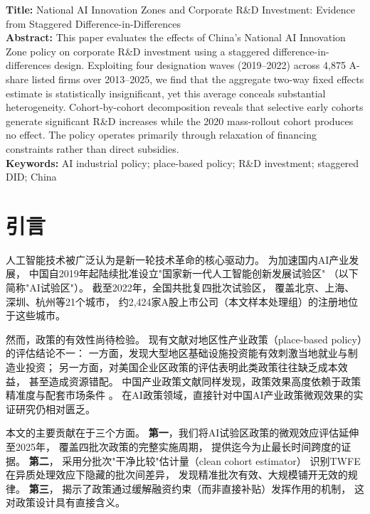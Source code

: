 \documentclass[12pt, a4paper]{article}
\begin{document}
\begin{titlepage}
\begin{center}
\begin{minipage}{0.88\textwidth}
\small{}
\textbf{Title:} National AI Innovation Zones and Corporate R\&D Investment:
Evidence from Staggered Difference-in-Differences\\[0.3em]
\textbf{Abstract:}
This paper evaluates the effects of China's National AI Innovation Zone policy
on corporate R\&D investment using a staggered difference-in-differences design.
Exploiting four designation waves (2019--2022) across 4,875 A-share listed firms
over 2013--2025, we find that the aggregate two-way fixed effects estimate is
statistically insignificant, yet this average conceals substantial heterogeneity.
Cohort-by-cohort decomposition reveals that selective early cohorts generate
significant R\&D increases while the 2020 mass-rollout cohort produces no effect.
The policy operates primarily through relaxation of financing constraints rather
than direct subsidies.\\[0.3em]
\textbf{Keywords:} AI industrial policy; place-based policy; R\&D investment;
staggered DID; China
\end{minipage}

\end{center}
\end{titlepage}

\setcounter{page}{1}

\section{引\quad 言}
\label{sec:intro}

人工智能技术被广泛认为是新一轮技术革命的核心驱动力。
为加速国内AI产业发展，
中国自2019年起陆续批准设立"国家新一代人工智能创新发展试验区"
（以下简称"AI试验区"）。
截至2022年，全国共批复四批次试验区，
覆盖北京、上海、深圳、杭州等21个城市，
约2,424家A股上市公司（本文样本处理组）的注册地位于这些城市。

然而，政策的有效性尚待检验。
现有文献对地区性产业政策（place-based policy）的评估结论不一：
一方面，\textcite{kline2014local}发现大型地区基础设施投资能有效刺激当地就业与制造业投资；
另一方面，\textcite{neumark2011enterprise}对美国企业区政策的评估表明此类政策往往缺乏成本效益，
甚至造成资源错配。
中国产业政策文献同样发现，政策效果高度依赖于政策精准度与配套市场条件
\parencite{lu2017industrial,barwick2021policy}。
在AI政策领域，直接针对中国AI产业政策微观效果的实证研究仍相对匮乏。

本文的主要贡献在于三个方面。
\textbf{第一}，我们将AI试验区政策的微观效应评估延伸至2025年，
覆盖四批次政策的完整实施周期，
提供迄今为止最长时间跨度的证据。
\textbf{第二}，
采用分批次"干净比较"估计量（clean cohort estimator）
识别TWFE在异质处理效应下隐藏的批次间差异，
发现精准批次有效、大规模铺开无效的规律。
\textbf{第三}，
揭示了政策通过缓解融资约束（而非直接补贴）发挥作用的机制，
这对政策设计具有直接含义。
\end{document}
